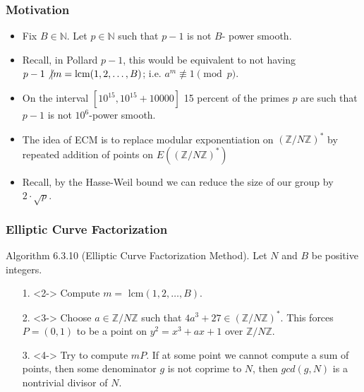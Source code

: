 \documentclass{beamer}
\begin{document}
\begin{frame}
\frametitle{Motivation}

\begin{itemize}
\item<2-> Fix $B \in \mathbb{N}$. Let $p \in \mathbb{N}$ such that $p-1$ is not $B$- power smooth.

\item<3-> Recall, in Pollard $p-1$, this would be equivalent to not having $p-1 \not \vert m = \text{lcm}(1,2, \ldots, B)$; i.e. $a^m \not \equiv 1 \pmod{p}$.

\item<4-> On the interval $[10^{15}, 10^{15} + 10000]$ 15 percent of the primes $p$ are such that $p-1$ is not $10^{6}$-power smooth.

\item<5-> The idea of ECM is to replace modular exponentiation on $\left(\mathbb{Z}/N\mathbb{Z}\right)^*$ by repeated addition of points on $E\left(\left(\mathbb{Z}/N\mathbb{Z}\right)^*\right)$

\item<6-> Recall, by the Hasse-Weil bound we can reduce the size of our group by $2\cdot \sqrt{p}$.
\end{itemize}
\end{frame}

\begin{frame}
\frametitle{Elliptic Curve Factorization}

Algorithm 6.3.10 (Elliptic Curve Factorization Method). Let $N$ and $B$ be positive integers.
\begin{itemize}
\item[1.]<2-> Compute $m =$ lcm$(1,2,\ldots, B)$.
\item[2.]<3-> Choose $a \in \mathbb{Z}/N\mathbb{Z}$ such that $4a^3 + 27 \in \left(\mathbb{Z}/N\mathbb{Z}\right)^*$. This forces $P = (0,1)$ to be a point on $y^2 = x^3 + ax +1$ over $\mathbb{Z}/N\mathbb{Z}$.
\item[3.]<4-> Try to compute $mP$. If at some point we cannot compute a sum of points, then some denominator $g$ is not coprime to $N$, then $gcd(g,N)$ is a nontrivial divisor of $N$.
\end{itemize}
\end{frame}
\end{document}
